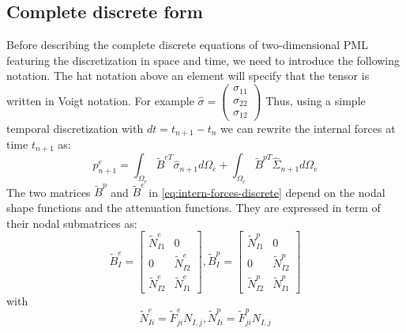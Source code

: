 \subsection{Complete discrete form}
Before describing the complete discrete equations of two-dimensional PML featuring the discretization in space and time, we need to introduce the following notation. The hat notation above an element will specify that the tensor is written in Voigt notation. For example $\hat{\sigma} = \begin{pmatrix}
\sigma_{11} \\
\sigma_{22} \\
\sigma_{12}
\end{pmatrix}$ 
Thus, using a simple temporal discretization with $dt=t_{n+1} - t_n$ we can rewrite the internal forces at time $t_{n+1}$ as:
\begin{equation}
p_{n+1}^e = \int_{\Omega_e} \tilde{B}^{eT} \hat{\sigma}_{n+1} d\Omega_e + \int_{\Omega_e}\tilde{B}^{pT} \hat{\Sigma}_{n+1} d\Omega_e
\label{eq:intern-forces-discrete}
\end{equation} 
The two matrices $\tilde{B}^{p}$ and $\tilde{B}^{e}$ in \ref{eq:intern-forces-discrete} depend on the nodal shape functions and the attenuation functions. They are expressed in term of their nodal submatrices as:
\begin{equation}
\tilde{B}^e_I = \begin{bmatrix}
\tilde{N}^e_{I1}&0\\0&\tilde{N}^e_{I2}\\\tilde{N}^e_{I2}&\tilde{N}^e_{I1}
\end{bmatrix}, \tilde{B}^p_I = \begin{bmatrix}
\tilde{N}^p_{I1}&0\\0&\tilde{N}^p_{I2}\\\tilde{N}^p_{I2}&\tilde{N}^p_{I1}
\end{bmatrix}
\end{equation} 
with 
\begin{equation}
\tilde{N}^e_{Ii} = \tilde{F}^e_{ji}N_{I,j}, \tilde{N}^p_{Ii} = \tilde{F}^p_{ji}N_{I,j}
\end{equation}

